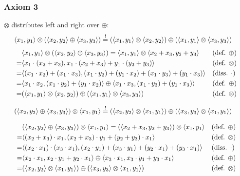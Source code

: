 \documentclass[a4paper,12pt]{ETHexercise}
\begin{document}
\subsubsection*{Axiom 3}
$\otimes$ distributes left and right over $\oplus$:
\begin{align}
        &\langle x_1, y_1\rangle \otimes (\langle x_2, y_2\rangle \oplus \langle x_3, y_3\rangle) \stackrel{!}{=} (\langle x_1, y_1\rangle \otimes \langle x_2, y_2\rangle) \oplus (\langle x_1, y_1\rangle \otimes\langle x_3, y_3\rangle)
\end{align}
\begin{align}
    &\langle x_1, y_1\rangle \otimes (\langle x_2, y_2\rangle \oplus \langle x_3, y_3\rangle) = \langle x_1, y_1\rangle \otimes \langle x_2 + x_3, y_2 + y_3\rangle &&(\text{def. }\oplus)\\
    = &\langle x_1 \cdot (x_2 + x_3), x_1 \cdot (x_2 + x_3) + y_1 \cdot (y_2 + y_3)\rangle &&(\text{def. }\otimes)\\
    = &\langle(x_1 \cdot x_2) + (x_1 \cdot x_3),  (x_1 \cdot y_2) + (y_1 \cdot x_2) + (x_1 \cdot y_3)  + (y_1 \cdot x_3)\rangle &&(\text{diss. }\cdot)\\
    = &\langle x_1 \cdot x_2, (x_1 \cdot y_2) + (y_1 \cdot x_2)\rangle \oplus \langle x_1 \cdot x_3, (x_1 \cdot y_3)  + (y_1 \cdot x_3)\rangle &&(\text{def. }\oplus)\\
    =   &(\langle x_1, y_1\rangle \otimes \langle x_2, y_2\rangle) \oplus (\langle x_1, y_1\rangle \otimes \langle x_3, y_3\rangle) &&(\text{def. }\otimes)
\end{align}

\begin{align}
        &(\langle x_2, y_2\rangle \oplus \langle x_3, y_3\rangle) \otimes \langle x_1, y_1\rangle \stackrel{!}{=} (\langle x_2, y_2\rangle \otimes \langle x_1, y_1\rangle) \oplus (\langle x_3, y_3\rangle \otimes \langle x_1, y_1\rangle)
\end{align}

\begin{align}
    &(\langle x_2, y_2\rangle \oplus \langle x_3, y_3\rangle) \otimes \langle x_1, y_1\rangle = (\langle x_2 + x_3, y_2 + y_3\rangle) \otimes \langle x_1, y_1\rangle &&(\text{def. }\oplus)\\
    = &\langle(x_2 + x_3) \cdot x_1, (x_2 + x_3) \cdot y_1 + (y_2 + y_3) \cdot x_1\rangle &&(\text{def. }\otimes)\\
    = &\langle(x_2 \cdot x_1) \cdot (x_3 \cdot x_1), (x_2 \cdot y_1) + (x_3 \cdot y_1) + (y_2 \cdot x_1)+ (y_3 \cdot x_1)\rangle &&(\text{diss. }\cdot)\\
    = &\langle x_2 \cdot x_1, x_2 \cdot y_1 + y_2 \cdot x_1\rangle \oplus \langle x_3 \cdot x_1, x_3 \cdot y_1 + y_3 \cdot x_1\rangle &&(\text{def. }\oplus)\\
    = &(\langle x_2, y_2\rangle \otimes \langle x_1, y_1\rangle) \oplus (\langle x_3, y_3\rangle \otimes \langle x_1, y_1\rangle) &&(\text{def. }\otimes)
\end{align}
\end{document}
